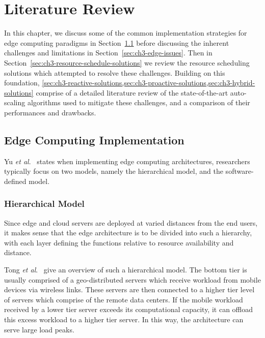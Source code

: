 \clearpage

\def\chaptertitle{Literature Review}

\lhead{\emph{\chaptertitle}}

\chapter{\chaptertitle}
\label{ch:lit-review}

In this chapter, we discuss some of the common implementation strategies for edge computing paradigms in Section~\ref{sec:ch3-edge-implementation} before discussing the inherent challenges and limitations in Section~\ref{sec:ch3-edge-issues}. Then in Section~\ref{sec:ch3-resource-schedule-solutions} we review the resource scheduling solutions which attempted to resolve these challenges. Building on this foundation, \cref{sec:ch3-reactive-solutions,sec:ch3-proactive-solutions,sec:ch3-hybrid-solutions} comprise of a detailed literature review of the state-of-the-art auto-scaling algorithms used to mitigate these challenges, and a comparison of their performances and drawbacks.

\section{Edge Computing Implementation}
\label{sec:ch3-edge-implementation}

Yu \textit{et al}.~\cite{yu2017survey} states when implementing edge computing architectures, researchers typically focus on two models, namely the hierarchical model, and the software-defined model.\par

\subsection{Hierarchical Model}
\label{subsec:ch3-hierarchical-model}

Since edge and cloud servers are deployed at varied distances from the end users, it makes sense that the edge architecture is to be divided into such a hierarchy, with each layer defining the functions relative to resource availability and distance.\par

Tong \textit{et al}.~\cite{tong2016hierarchical} give an overview of such a hierarchical model. The bottom tier is usually comprised of a geo-distributed servers which receive workload from mobile devices via wireless links. These servers are then connected to a higher tier level of servers which comprise of the remote data centers. If the mobile workload received by a lower tier server exceeds its computational capacity, it can offload this excess workload to a higher tier server. In this way, the architecture can serve large load peaks.\par

